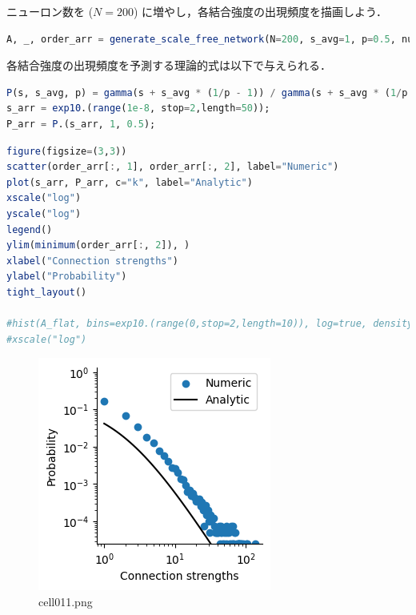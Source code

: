 ニューロン数を ($N=200$) に増やし，各結合強度の出現頻度を描画しよう．
\begin{lstlisting}[language=julia]
A, _, order_arr = generate_scale_free_network(N=200, s_avg=1, p=0.5, num_iter=5000, num_prune_edge=50);
\end{lstlisting}
各結合強度の出現頻度を予測する理論的式は以下で与えられる．
\begin{lstlisting}[language=julia]
P(s, s_avg, p) = gamma(s + s_avg * (1/p - 1)) / gamma(s + s_avg * (1/p - 1) + 1/p + 1)
s_arr = exp10.(range(1e-8, stop=2,length=50));
P_arr = P.(s_arr, 1, 0.5);
\end{lstlisting}
\begin{lstlisting}[language=julia]
figure(figsize=(3,3))
scatter(order_arr[:, 1], order_arr[:, 2], label="Numeric")
plot(s_arr, P_arr, c="k", label="Analytic")
xscale("log")
yscale("log")
legend()
ylim(minimum(order_arr[:, 2]), )
xlabel("Connection strengths")
ylabel("Probability")
tight_layout()

#hist(A_flat, bins=exp10.(range(0,stop=2,length=10)), log=true, density=true);
#xscale("log")
\end{lstlisting}
\begin{figure}[ht]
	\centering
	\includegraphics[scale=0.8, max width=\linewidth]{./fig/local-learning-rule/heavy-tail/cell011.png}
	\caption{cell011.png}
	\label{cell011.png}
\end{figure}
